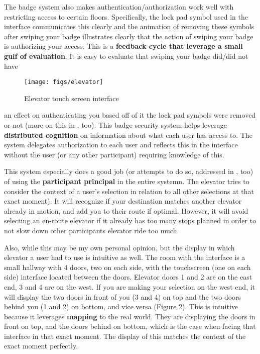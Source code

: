 The badge system also makes authentication/authorization work well with restricting access to certain floors. Specifically, the lock pad symbol used in the interface communicates this clearly and the animation of removing these symbols after swiping your badge illustrates clearly that the action of swiping your badge is authorizing your access. This is a \textbf{feedback cycle that leverage a small gulf of evaluation}. It is easy to evaluate that swiping your badge did/did not have

\clearpage

\begin{figure}[H]
  \centering
  \texttt{[image: figs/elevator]}
  \caption{Elevator touch screen interface}
  \label{fig::1}
\end{figure}

an effect on authenticating you based off of it the lock pad symbols were removed or not (more on this in , too). This badge security system helps leverage \textbf{distributed cognition} on information about what each user has access to. The system delegates authorization to each user and reflects this in the interface without the user (or any other participant) requiring knowledge of this.

This system especially does a good job (or attempts to do so, addressed in , too) of using the \textbf{participant principal} in the entire systemn. The elevator tries to consider the context of a user's selection in relation to all other selections at that exact moment). It will recognize if your destination matches another elevator already in motion, and add you to their route if optimal. However, it will avoid selecting an en-route elevator if it already has too many stops planned in order to not slow down other participants elevator ride too much.

Also, while this may be my own personal opinion, but the display in which elevator a user had to use is intuitive as well. The room with the interface is a small hallway with 4 doors, two on each side, with the touchscreen (one on each side) interface located between the doors. Elevator doors 1 and 2 are on the east end, 3 and 4 are on the west. If you are making your selection on the west end, it will display the two doors in front of you (3 and 4) on top and the two doors behind you (1 and 2) on bottom, and vice versa (Figure 2). This is intuitive because it leverages \textbf{mapping} to the real world. They are displaying the doors in front on top, and the doors behind on bottom, which is the case when facing that interface in that exact moment. The display of this matches the context of the exact moment perfectly.

